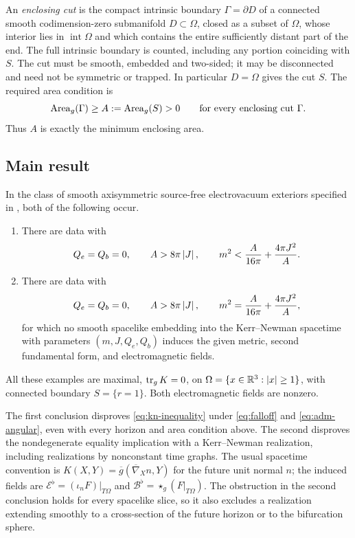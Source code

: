 An \emph{enclosing cut} is the compact intrinsic boundary
\(\Gamma=\partial D\) of a connected smooth codimension-zero submanifold
\(D\subset\Omega\), closed as a subset of \(\Omega\), whose interior lies
in \(\operatorname{int}\Omega\) and which contains the entire sufficiently
distant part of the end. The full intrinsic boundary is counted, including
any portion coinciding with \(S\). The cut must be smooth, embedded and
two-sided; it may be disconnected and need not be symmetric or trapped.
In particular \(D=\Omega\) gives the cut \(S\). The required area condition is
\begin{equation}\label{eq:outer-area-condition}
 \operatorname{Area}_g(\Gamma)\ge A:=\operatorname{Area}_g(S)>0
 \qquad\text{for every enclosing cut }\Gamma.
\end{equation}
Thus \(A\) is exactly the minimum enclosing area.

\subsection{Main result}\label{sec:main-result}

\begin{theorem}\label{thm:main}
In the class of smooth axisymmetric source-free electrovacuum exteriors
specified in , both of the following occur.
\begin{enumerate}
 \item There are data with
 \[
 Q_e=Q_b=0,\qquad A>8\pi\left\lvert J\right\rvert,
 \qquad m^2<\frac{A}{16\pi}+\frac{4\pi J^2}{A}.
 \]
 \item There are data with
 \[
 Q_e=Q_b=0,\qquad A>8\pi\left\lvert J\right\rvert,
 \qquad m^2=\frac{A}{16\pi}+\frac{4\pi J^2}{A},
 \]
 for which no smooth spacelike embedding into the Kerr--Newman spacetime
 with parameters \((m,J,Q_e,Q_b)\) induces the given metric, second
 fundamental form, and electromagnetic fields.
\end{enumerate}
All these examples are maximal, \(\operatorname{tr}_gK=0\), on
\(\Omega=\{x\in\mathbb R^3:\left\lvert x\right\rvert\ge1\}\), with connected boundary
\(S=\{r=1\}\). Both electromagnetic fields are nonzero.
\end{theorem}

The first conclusion disproves \eqref{eq:kn-inequality} under
\eqref{eq:falloff} and \eqref{eq:adm-angular}, even with every horizon and
area condition above. The second disproves the nondegenerate equality
implication with a Kerr--Newman realization, including realizations by
nonconstant time graphs. The usual spacetime convention is
\(K(X,Y)=\overline g(\overline\nabla_X n,Y)\) for the future unit normal
\(n\); the induced fields are
\(\mathcal E^\flat=(\iota_nF)|_{T\Omega}\) and
\(\mathcal B^\flat=\star_g(F|_{T\Omega})\).
The obstruction in the second conclusion holds for every spacelike slice,
so it also excludes a realization extending smoothly to a cross-section
of the future horizon or to the bifurcation sphere.

